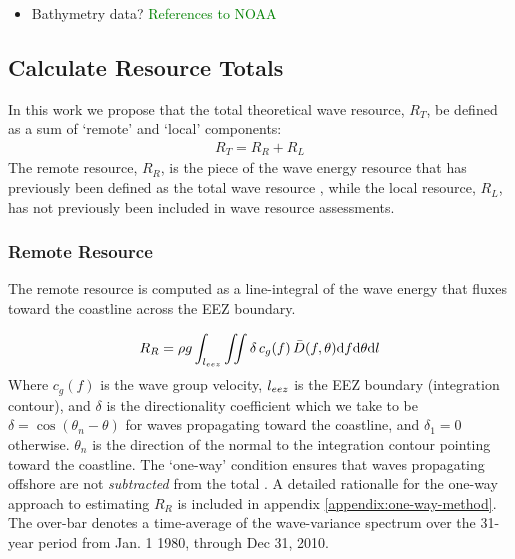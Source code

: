 \begin{itemize}
\item Bathymetry data? \textcolor{green}{References to NOAA}
\end{itemize}


\subsection{Calculate Resource Totals} \label{sec:method:calc}

In this work we propose that the total theoretical wave resource, $R_T$, be defined as a sum of `remote' and `local' components:
\begin{align}
  R_T = R_R + R_L
\end{align}
The remote resource, $R_R$, is the piece of the wave energy resource that has previously been defined as the total wave resource \citep{gunnQuantifyingGlobalWave2012,EPRIwaveresource2011}, while the local resource, $R_L$, has not previously been included in wave resource assessments.

\subsubsection{Remote Resource} \label{sec:method:calc:remote}

The remote resource is computed as a line-integral of the wave energy that fluxes toward the coastline across the EEZ boundary. 

\begin{align}
  R_R = \rho g \int_{l_{eez}}\iint \delta \, c_g(f) \, \bar{D}(f,\theta) \mathrm{d} f \mathrm{d} \theta \mathrm{d} l
\label{eqn:RR}
\end{align}
Where $c_g(f)$ is the wave group velocity, $l_{eez}$ is the EEZ boundary (integration contour), and $\delta$ is the directionality coefficient which we take to be $\delta = \cos(\theta_n - \theta)$ for waves propagating toward the coastline, and $\delta_1 = 0$ otherwise. $\theta_n$ is the direction of the normal to the integration contour pointing toward the coastline. The `one-way' condition ensures that waves propagating offshore are not {\em subtracted} from the total \citep[]{gunnQuantifyingGlobalWave2012}. A detailed rationalle for the one-way approach to estimating $R_R$ is included in appendix \ref{appendix:one-way-method}. The over-bar denotes a time-average of the wave-variance spectrum over the 31-year period from Jan. 1 1980, through Dec 31, 2010.

